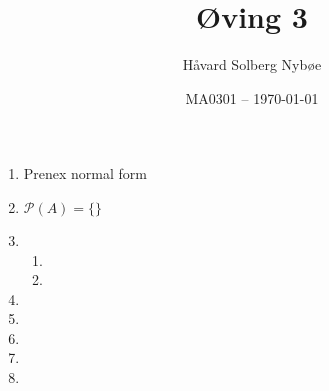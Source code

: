 \documentclass[a4paper, 12pt]{article}  %
\title{Øving 3}                         %
\author{Håvard Solberg Nybøe}           %
\date{MA0301 -- \today}                 %
\begin{document}
\maketitle

\begin{enumerate}
    \item [\boxed{1}] Prenex normal form
    \item [\boxed{2}] $\mathcal{P}(A) = \{\}$
    \item [\boxed{3}]
          \begin{enumerate}
              \item
              \item
          \end{enumerate}
    \item [\boxed{4}]
    \item [\boxed{5}]
    \item [\boxed{6}]
    \item [\boxed{7}]
    \item [\boxed{8}]
\end{enumerate}

\end{document}
